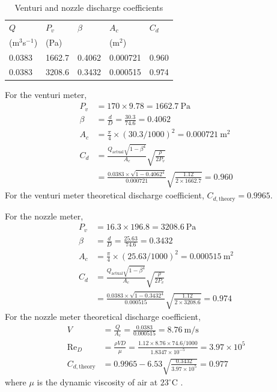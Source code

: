 \begin{table}[h]
    \centering
    \caption{Venturi and nozzle discharge coefficients}
    \label{tab:venturi_and_nozzle_discharge_coefficients}
    \begin{tabular}{p{2cm}p{2cm}p{2cm}p{2cm}p{2cm}}
        \toprule
        $Q$ & $P_v$ & $\beta$ & $A_c$ & $C_d$ \\
        (m$^3$s$^{-1}$) & (Pa) & & (m$^2$) & \\
        \midrule
        0.0383 & 1662.7 & 0.4062 & 0.000721 & 0.960 \\
        0.0383 & 3208.6 & 0.3432 & 0.000515 & 0.974 \\
        \bottomrule
    \end{tabular}
\end{table}
For the venturi meter, 
\begin{align*}
    P_v &= 170 \times 9.78 = \qty{1662.7}{\pascal} \\
    \beta &= \frac{d}{D} = \frac{30.3}{74.6} = 0.4062 \\
    A_c &= \frac{\pi}{4} \times \left(30.3/1000\right)^2 = \qty{0.000721}{\meter\squared} \\
    C_d &= \frac{Q_{\text{actual}}\sqrt{1 - \beta^4}}{A_c} \sqrt{\frac{\rho}{2 P_v}} \\
    &= \frac{0.0383 \times \sqrt{1 - 0.4062^4}}{0.000721}\sqrt{\frac{1.12}{2 \times 1662.7}} = \boxed{0.960}
\end{align*}
For the venturi meter theoretical discharge coefficient, $\boxed{C_{d, \text{theory}} = 0.9965}$.

For the nozzle meter,
\begin{align*}
    P_v &= 16.3 \times 196.8 = \qty{3208.6}{\pascal} \\
    \beta &= \frac{d}{D} = \frac{25.63}{74.6} = 0.3432 \\
    A_c &= \frac{\pi}{4} \times \left(25.63/1000\right)^2 = \qty{0.000515}{\meter\squared} \\
    C_d &= \frac{Q_{\text{actual}}\sqrt{1 - \beta^4}}{A_c} \sqrt{\frac{\rho}{2 P_v}} \\
    &= \frac{0.0383 \times \sqrt{1 - 0.3432^4}}{0.000515}\sqrt{\frac{1.12}{2 \times 3208.6}} = \boxed{0.974}
\end{align*}
For the nozzle meter theoretical discharge coefficient, 
\begin{align*}
    V &= \frac{Q}{A_c} = \frac{0.0383}{0.000515} = \qty{8.76}{\meter\per\second} \\
    \text{Re}_D &= \frac{\rho V D}{\mu} = \frac{1.12 \times 8.76 \times 74.6/1000}{1.8347 \times 10^{-5}} = 3.97 \times 10^5 \\
    C_{d, \text{theory}} &= 0.9965 - 6.53 \sqrt{\frac{0.3432}{3.97 \times 10^5}} = \boxed{0.977}
\end{align*}
where $\mu$ is the dynamic viscosity of air at $23^\circ$C \cite{bond_viscosity_1937}.

